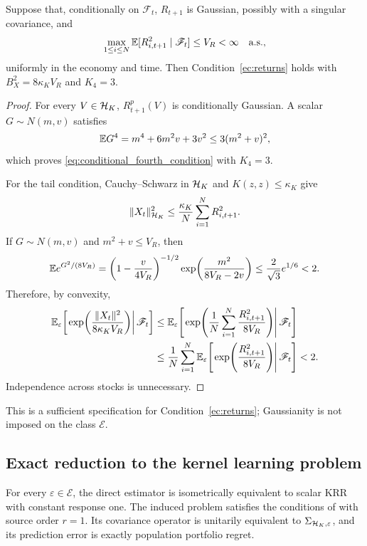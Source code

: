 \begin{proposition}
\label{prop:gaussian_admissible}
Suppose that, conditionally on $\mathscr F_t$, $R_{t+1}$ is Gaussian, possibly
with a singular covariance, and
\[
\max_{1\leq i\leq N}\mathbb{E}[R_{i,t+1}^2\mid\mathscr F_t]\leq V_R<\infty
\quad\text{a.s.},
\]
uniformly in the economy and time. Then Condition~\ref{ec:returns} holds
with $B_X^2=8\kappa_KV_R$ and $K_4=3$.
\end{proposition}
\begin{proof}
For every $V\in\mathcal{H}_K$, $R^p_{t+1}(V)$ is conditionally Gaussian. A scalar
$G\sim N(m,v)$ satisfies
\[
\mathbb{E} G^4=m^4+6m^2v+3v^2\leq3(m^2+v)^2,
\]
which proves \eqref{eq:conditional_fourth_condition} with $K_4=3$.

For the tail condition, Cauchy--Schwarz in $\mathcal{H}_K$ and
$K(z,z)\leq\kappa_K$ give
\[
\|X_t\|_{\mathcal{H}_K}^2
\leq
\frac{\kappa_K}{N}\sum_{i=1}^N R_{i,t+1}^2.
\]
If $G\sim N(m,v)$ and $m^2+v\leq V_R$, then
\[
\mathbb{E} e^{G^2/(8V_R)}
=\left(1-\frac{v}{4V_R}\right)^{-1/2}
  \exp\!\left(\frac{m^2}{8V_R-2v}\right)
\leq\frac{2}{\sqrt3}e^{1/6}<2.
\]
Therefore, by convexity,
\[
\begin{aligned}
\mathbb{E}_\varepsilon\!\left[
\left.
\exp\!\left(\frac{\|X_t\|^2}{8\kappa_KV_R}\right)
\right|\mathscr F_t
\right]
&\leq
\mathbb{E}_\varepsilon\!\left[
\left.
\exp\!\left(\frac1N\sum_{i=1}^N
              \frac{R_{i,t+1}^2}{8V_R}\right)
\right|\mathscr F_t
\right]\\
&\leq
\frac1N\sum_{i=1}^N
\mathbb{E}_\varepsilon\!\left[
\left.
\exp\!\left(\frac{R_{i,t+1}^2}{8V_R}\right)
\right|\mathscr F_t
\right]
<2.
\end{aligned}
\]
Independence across stocks is unnecessary.
\end{proof}

This is a sufficient specification for Condition~\ref{ec:returns};
Gaussianity is not imposed on the class $\mathcal E$.

\subsection{Exact reduction to the kernel learning problem}
\label{app:induced_krr}

\begin{lemma}
\label{lem:induced_krr}
For every $\varepsilon\in\mathcal E$, the direct estimator is isometrically
equivalent to scalar KRR with constant response one. The induced problem
satisfies the conditions of \citet[Lemma~A.7]{bignozzigagliardinischneider2026}
with source order $r=1$. Its covariance operator is unitarily equivalent to
$\Sigma_{\mathcal{H}_K,\varepsilon}$, and its prediction error is exactly population
portfolio regret.
\end{lemma}

